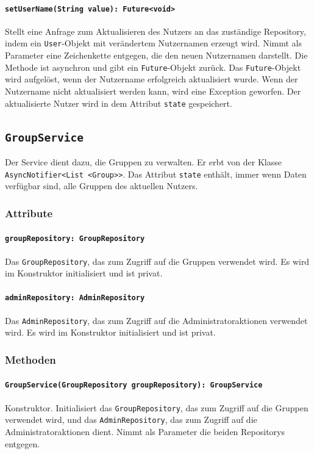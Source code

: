 \documentclass{entwurfsheft}
\begin{document}
\paragraph{\texttt{setUserName(String value): Future<void>}}
Stellt eine Anfrage zum Aktualisieren des Nutzers an das zuständige Repository, indem ein \texttt{User}-Objekt mit verändertem Nutzernamen erzeugt wird. Nimmt als Parameter eine Zeichenkette entgegen, die den neuen Nutzernamen darstellt. Die Methode ist asynchron und gibt ein \texttt{Future}-Objekt zurück. Das \texttt{Future}-Objekt wird aufgelöst, wenn der Nutzername erfolgreich aktualisiert wurde. Wenn der Nutzername nicht aktualisiert werden kann, wird eine Exception geworfen. Der aktualisierte Nutzer wird in dem Attribut \texttt{state} gespeichert.

\newpage
\subsection{\texttt{GroupService}}\label{sec:groupservice}
Der Service dient dazu, die Gruppen zu verwalten. Er erbt von der Klasse \texttt{AsyncNotifier<List <Group>>}. Das Attribut \texttt{state} enthält, immer wenn Daten verfügbar sind, alle Gruppen des aktuellen Nutzers.
\subsubsection*{Attribute}
\paragraph{\texttt{groupRepository: GroupRepository}}
Das \texttt{GroupRepository}, das zum Zugriff auf die Gruppen verwendet wird. Es wird im Konstruktor initialisiert und ist privat.
\paragraph{\texttt{adminRepository: AdminRepository}}
Das \texttt{AdminRepository}, das zum Zugriff auf die Administratoraktionen verwendet wird. Es wird im Konstruktor initialisiert und ist privat.
\subsubsection*{Methoden}
\paragraph{\texttt{GroupService(GroupRepository groupRepository): GroupService}}
Konstruktor. Initialisiert das \texttt{GroupRepository}, das zum Zugriff auf die Gruppen verwendet wird, und das \texttt{AdminRe\-pository}, das zum Zugriff auf die Administratoraktionen dient. Nimmt als Parameter die beiden Repositorys entgegen.
\end{document}
